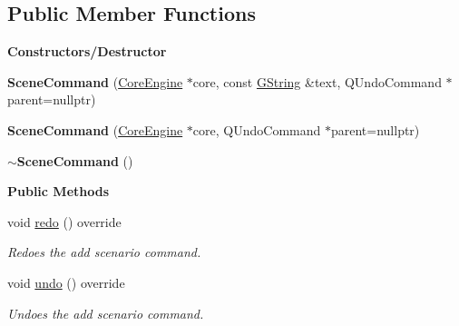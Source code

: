 \subsection*{Public Member Functions}
\begin{Indent}\textbf{ Constructors/\+Destructor}\par
\begin{DoxyCompactItemize}
\item 
\mbox{\label{classrev_1_1_scene_command_a1af81c83fbd33e439416bf6247e77511}} 
{\bfseries Scene\+Command} (\mbox{\hyperlink{classrev_1_1_core_engine}{Core\+Engine}} $\ast$core, const \mbox{\hyperlink{classrev_1_1_g_string}{G\+String}} \&text, Q\+Undo\+Command $\ast$parent=nullptr)
\item 
\mbox{\label{classrev_1_1_scene_command_a785ab44c501192cf7f2acf5ec6670845}} 
{\bfseries Scene\+Command} (\mbox{\hyperlink{classrev_1_1_core_engine}{Core\+Engine}} $\ast$core, Q\+Undo\+Command $\ast$parent=nullptr)
\item 
\mbox{\label{classrev_1_1_scene_command_a50f9f81858789c1d23103e3c278e6926}} 
{\bfseries $\sim$\+Scene\+Command} ()
\end{DoxyCompactItemize}
\end{Indent}
\begin{Indent}\textbf{ Public Methods}\par
\begin{DoxyCompactItemize}
\item 
\mbox{\label{classrev_1_1_scene_command_ad4d775a40a8078271b520696fd92e23f}} 
void \mbox{\hyperlink{classrev_1_1_scene_command_ad4d775a40a8078271b520696fd92e23f}{redo}} () override
\begin{DoxyCompactList}\small\item\em Redoes the add scenario command. \end{DoxyCompactList}\item 
\mbox{\label{classrev_1_1_scene_command_a4864e03e5836c56587cdf4b88b6e47ae}} 
void \mbox{\hyperlink{classrev_1_1_scene_command_a4864e03e5836c56587cdf4b88b6e47ae}{undo}} () override
\begin{DoxyCompactList}\small\item\em Undoes the add scenario command. \end{DoxyCompactList}\end{DoxyCompactItemize}
\end{Indent}
